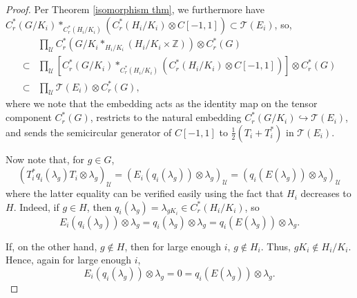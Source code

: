 \documentclass[10pt,a4paper]{amsart}
\newcommand{\Z}{\ensuremath{\mathbb{Z}}}
\newcommand{\cT}{\ensuremath{\mathcal{T}}}
\newcommand{\cU}{\ensuremath{\mathcal{U}}}
\begin{document}
\begin{proof}
    Per Theorem \ref{isomorphism thm}, we furthermore have $C_r^\ast(G/K_i) \ast_{C_r^\ast(H_i/K_i)} (C_r^\ast(H_i/K_i) \otimes C[-1,1]) \subset \cT(E_i)$, so,
    \begin{equation}\label{eqn: embedding 2}
    \begin{split}
        &\prod_\cU C_r^\ast(G/K_i \ast_{H_i/K_i} (H_i/K_i\times\Z)) \otimes C_r^\ast(G)\\
        \subset &\prod_\cU [C_r^\ast(G/K_i) \ast_{C_r^\ast(H_i/K_i)} (C_r^\ast(H_i/K_i) \otimes C[-1,1])] \otimes C_r^\ast(G)\\
        \subset &\prod_\cU \cT(E_i) \otimes C_r^\ast(G),
    \end{split}
    \end{equation}
    where we note that the embedding acts as the identity map on the tensor component $C_r^\ast(G)$, restricts to the natural embedding $C_r^\ast(G/K_i) \hookrightarrow \cT(E_i)$, and sends the semicircular generator of $C[-1, 1]$ to $\frac{1}{2}(T_i + T_i^\ast)$ in $\cT(E_i)$.
    
    Now note that, for $g \in G$,
    \begin{equation*}
        (T_i^\ast q_i(\lambda_g)T_i \otimes \lambda_g)_\cU = (E_i(q_i(\lambda_g)) \otimes \lambda_g)_\cU = (q_i(E(\lambda_g)) \otimes \lambda_g)_\cU
    \end{equation*}
    where the latter equality can be verified easily using the fact that $H_i$ decreases to $H$. Indeed, if $g \in H$, then $q_i(\lambda_g) = \lambda_{gK_i} \in C_r^\ast(H_i/K_i)$, so
    \begin{equation*}
        E_i(q_i(\lambda_g)) \otimes \lambda_g = q_i(\lambda_g) \otimes \lambda_g = q_i(E(\lambda_g)) \otimes \lambda_g.
    \end{equation*}

    If, on the other hand, $g \notin H$, then for large enough $i$, $g \notin H_i$. Thus, $gK_i \notin H_i/K_i$. Hence, again for large enough $i$,
    \begin{equation*}
        E_i(q_i(\lambda_g)) \otimes \lambda_g = 0 = q_i(E(\lambda_g)) \otimes \lambda_g.
    \end{equation*}
    

\end{proof}
\end{document}

